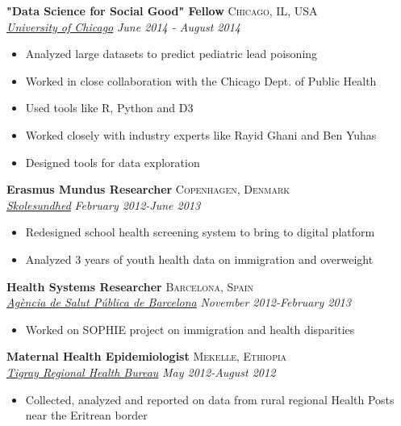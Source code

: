 \documentclass[11pt]{article}
\begin{document}
\noindent \textbf{"Data Science for Social Good" Fellow} \hfill \textsc{Chicago, IL, USA}\\
\noindent \emph{\href{http://www.uchicago.edu/}{University of Chicago}} \hfill \emph{June 2014 - August 2014}
\vspace{-2mm}
\begin{itemize}\itemsep0pt \parskip0pt 
\item Analyzed large datasets to predict pediatric lead poisoning
\item Worked in close collaboration with the Chicago Dept. of Public Health
\item Used tools like R, Python and D3
\item Worked closely with industry experts like Rayid Ghani and Ben Yuhas
\item Designed tools for data exploration
\end{itemize}


\noindent \textbf{Erasmus Mundus Researcher} \hfill \textsc{Copenhagen, Denmark}\\
\noindent \emph{\href{https://www.skolesundhed.dk/Default.aspx}{Skolesundhed}} \hfill \emph{February 2012-June 2013}
\vspace{-2mm}
\begin{itemize}\itemsep0pt \parskip0pt 
\item Redesigned school health screening system to bring to digital platform 
\item Analyzed 3 years of youth health data on immigration and overweight
\end{itemize}

\noindent \textbf{Health Systems Researcher} \hfill \textsc{Barcelona, Spain}\\
\noindent \emph{\href{http://www.aspb.cat/}{Agència de Salut Pública de Barcelona}} \hfill \emph{November 2012-February 2013}
\vspace{-2mm}
\begin{itemize}\itemsep0pt \parskip0pt 
\item Worked on SOPHIE project on immigration and health disparities 
\end{itemize}

\noindent \textbf{Maternal Health Epidemiologist} \hfill \textsc{Mekelle, Ethiopia}\\
\noindent \emph{\href{http://www.moh.gov.et/tigrayhb}{Tigray Regional Health Bureau}} \hfill \emph{May 2012-August 2012}
\vspace{-2mm}
\begin{itemize}\itemsep0pt \parskip0pt 
\item Collected, analyzed and reported on data from rural regional Health Posts near the Eritrean border
\end{itemize}
\end{document}
